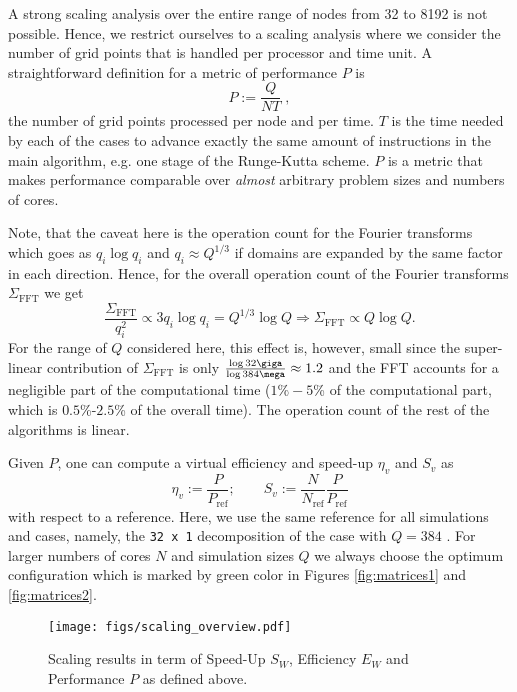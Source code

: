 A strong scaling analysis over the entire range of nodes from 32 to 8192 is not
possible. Hence, we restrict ourselves to a scaling analysis where we consider
the number of grid points that is handled per processor and time unit. A
straightforward definition for a metric of performance $P$ is
\begin{equation}
  P:=\frac{Q}{N T} \;,
\end{equation}
the number of grid points processed per node and per time. $T$ is the time
needed by each of the cases to advance exactly the same amount of instructions
in the main algorithm, e.g. one stage of the Runge-Kutta scheme. $P$ is a metric
that makes performance comparable over \textit{almost} arbitrary problem sizes
and numbers of cores.

Note, that the caveat here is the operation count for the Fourier transforms
which goes as $q_i \log q_i$ and $q_i \approx Q^{1/3}$ if domains are expanded
by the same factor in each direction. Hence, for the overall operation count of
the Fourier transforms $\Sigma_\mathrm{FFT}$ we get
\begin{equation}
\frac{\Sigma_{\mathrm{FFT}}}{q_{i}^{2}}\propto 3 q_i \log q_i = Q^{1/3} \log
Q\Rightarrow \Sigma_\mathrm{FFT}\propto Q\log Q.
\end{equation} 
For the range of $Q$ considered here, this effect is, however, small since the
super-linear contribution of $\Sigma_\mathrm{FFT}$ is only $\frac{\log 32\giga
}{\log 384\mega} \approx 1.2$ and the FFT accounts for a negligible part of the
computational time ($1\%-5$\% of the computational part, which is
$0.5$\%-$2.5$\% of the overall time).  The operation count of the rest of the
algorithms is linear.

Given $P$, one can compute a virtual efficiency and speed-up $\eta_v$ and $S_v$ as 
\begin{equation}
\eta_v:=\frac{P}{P_\mathrm{ref}}; \qquad S_v:=\frac{N}{N_\mathrm{ref}}\frac{P}{P_\mathrm{ref}}
\end{equation} 
with respect to a reference. Here, we use the same reference for all simulations
and cases, namely, the \texttt{32 x 1} decomposition of the case with
$Q=384$ \mega. For larger numbers of cores $N$ and simulation sizes $Q$ we
always choose the optimum configuration which is marked by green color in
Figures \ref{fig:matrices1} and \ref{fig:matrices2}.

\begin{figure}
\begin{centering}
\texttt{[image: figs/scaling\_overview.pdf]}
\end{centering}
\caption{Scaling results in term of Speed-Up $S_W$, Efficiency $E_W$ and
Performance $P$ as defined above.}
\label{fig:v_scaling1}
\end{figure}

